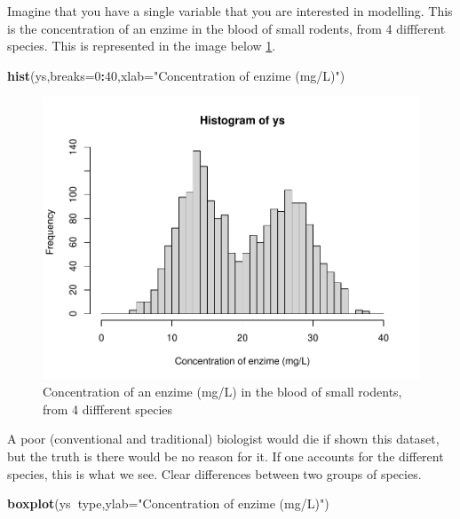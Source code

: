 \documentclass[
]{book}
\newenvironment{Shaded}{\begin{snugshade}}{\end{snugshade}}
\newcommand{\DataTypeTok}[1]{\textcolor[rgb]{0.13,0.29,0.53}{#1}}
\newcommand{\DecValTok}[1]{\textcolor[rgb]{0.00,0.00,0.81}{#1}}
\newcommand{\KeywordTok}[1]{\textcolor[rgb]{0.13,0.29,0.53}{\textbf{#1}}}
\newcommand{\NormalTok}[1]{#1}
\newcommand{\OperatorTok}[1]{\textcolor[rgb]{0.81,0.36,0.00}{\textbf{#1}}}
\newcommand{\StringTok}[1]{\textcolor[rgb]{0.31,0.60,0.02}{#1}}
\begin{document}
Imagine that you have a single variable that you are interested in modelling. This is the concentration of an enzime in the blood of small rodents, from 4 diffferent species. This is represented in the image below \ref{fig:figrodents}.

\begin{Shaded}
\begin{Highlighting}[]
\KeywordTok{hist}\NormalTok{(ys,}\DataTypeTok{breaks=}\DecValTok{0}\OperatorTok{:}\DecValTok{40}\NormalTok{,}\DataTypeTok{xlab=}\StringTok{"Concentration of enzime (mg/L)"}\NormalTok{)}
\end{Highlighting}
\end{Shaded}

\begin{figure}

{\centering \includegraphics[width=0.8\linewidth]{ECOMODbook_files/figure-latex/figrodents-1} 

}

\caption{Concentration of an enzime (mg/L) in the blood of small rodents, from 4 diffferent species}\label{fig:figrodents}
\end{figure}

A poor (conventional and traditional) biologist would die if shown this dataset, but the truth is there would be no reason for it. If one accounts for the different species, this is what we see. Clear differences between two groups of species.

\begin{Shaded}
\begin{Highlighting}[]
\KeywordTok{boxplot}\NormalTok{(ys}\OperatorTok{~}\NormalTok{type,}\DataTypeTok{ylab=}\StringTok{"Concentration of enzime (mg/L)"}\NormalTok{)}
\end{Highlighting}
\end{Shaded}
\end{document}
